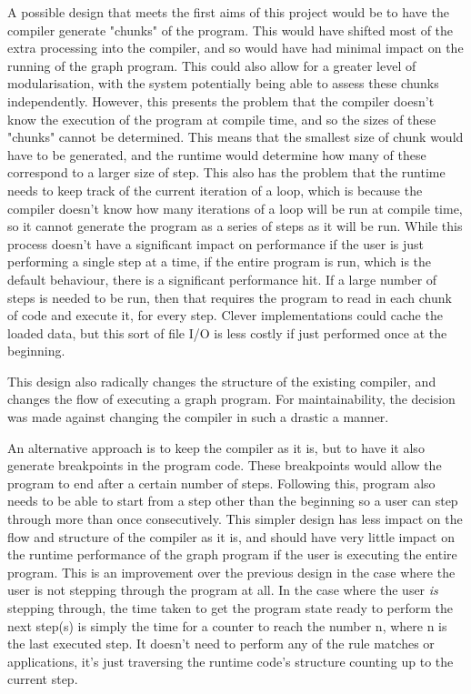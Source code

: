 \documentclass{UoYCSproject}
\begin{document}
A possible design that meets the first aims of this project would be to have the compiler generate "chunks" of the program. This would have shifted most of the extra processing into the compiler, and so would have had minimal impact on the running of the graph program. This could also allow for a greater level of modularisation, with the system potentially being able to assess these chunks independently.
However, this presents the problem that the compiler doesn't know the execution of the program at compile time, and so the sizes of these "chunks" cannot be determined. This means that the smallest size of chunk would have to be generated, and the runtime would determine how many of these correspond to a larger size of step. This also has the problem that the runtime needs to keep track of the current iteration of a loop, which is because the compiler doesn't know how many iterations of a loop will be run at compile time, so it cannot generate the program as a series of steps as it will be run. While this process doesn't have a significant impact on performance if the user is just performing a single step at a time, if the entire program is run, which is the default behaviour, there is a significant performance hit. If a large number of steps is needed to be run, then that requires the program to read in each chunk of code and execute it, for every step. Clever implementations could cache the loaded data, but this sort of file I/O is less costly if just performed once at the beginning.

This design also radically changes the structure of the existing compiler, and changes the flow of executing a graph program. For maintainability, the decision was made against changing the compiler in such a drastic a manner.

An alternative approach is to keep the compiler as it is, but to have it also generate breakpoints in the program code. These breakpoints would allow the program to end after a certain number of steps. Following this, program also needs to be able to start from a step other than the beginning so a user can step through more than once consecutively. This simpler design has less impact on the flow and structure of the compiler as it is, and should have very little impact on the runtime performance of the graph program if the user is executing the entire program. This is an improvement over the previous design in the case where the user is not stepping through the program at all. In the case where the user \emph{is} stepping through, the time taken to get the program state ready to perform the next step(s) is simply the time for a counter to reach the number n, where n is the last executed step. It doesn't need to perform any of the rule matches or applications, it's just traversing the runtime code's structure counting up to the current step. 
\end{document}
